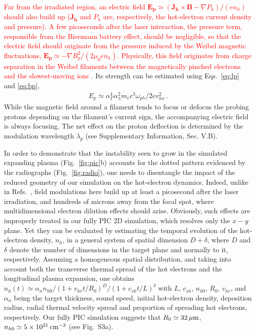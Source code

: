 \documentclass[aps,twocolumn,showpacs,superscriptaddress]{revtex4}
\begin{document}
\textcolor{red}{Far from the irradiated region, an electric field \mbox{$\mathbf{E_p} \simeq (\mathbf{J_h} \times \mathbf{B}-\nabla P_h)/(e n_h)$} should also build up ($\mathbf{J_h}$ and $P_h$ are, respectively, the hot-electron current density and pressure). A few picoseconds after the laser interaction, the pressure term, responsible from the Biermann battery effect, should be negligible, so that the electric field should originate from the pressure induced by the Weibel magnetic fluctuations, $\mathbf{E_p} \simeq - \nabla B_p^2/(2 \mu_0 e n_h)$. Physically, this field originates from charge separation in the Weibel filaments between the magnetically pinched electrons and the slowest-moving ions} \cite{POP_Dieckmann_2009, POP_Bret_Gremillet_2010}.
Its strength can be estimated using Eqs.~\eqref{eq:lp} and \eqref{eq:bp},
\begin{align} 
  E_p \simeq \alpha_\Gamma^4  \alpha_\lambda^2 m_ec^3\omega_{ph}/2ev_{hx}^2 \label{eq:ep} \, .
\end{align}
While the magnetic field around a filament tends to focus or defocus the probing protons depending on the filament's current sign, the accompanying electric field  is always focusing. The net effect on the proton deflection is determined by the modulation wavelength $\lambda_p$ (see Supplementary Information, Sec. V.B).

In order to demonstrate that the instability seen to grow in the simulated expanding plasma (Fig.~\ref{fig:pic}b) accounts for the dotted pattern evidenced by the radiographs (Fig.~\ref{fig:radio}), one needs to disentangle the impact of the reduced geometry of our simulation on the hot-electron dynamics. Indeed, unlike in Refs.~\cite{PRL_Gode_2017, NJP_Scott_2017}, field modulations here build up at least a picosecond after the laser irradiation, and hundreds of microns away from the focal spot, where multidimensional electron dilution effects should arise. Obviously, such effects are improperly treated in our fully PIC 2D simulation, which resolves only the $x-y$ plane. Yet they can be evaluated by estimating the temporal evolution of the hot-electron density, $n_h$, in a general system of spatial dimension $D+\delta$, where $D$ and $\delta$ denote the number of dimensions in the target plane and normally to it, respectively. Assuming a homogeneous spatial distribution, and taking into account both the transverse thermal spread of the hot electrons and the longitudinal plasma expansion, one obtains $n_h(t) \simeq \alpha_n n_{h0}/(1+ v_{hr} t /R_0)^D/(1+c_{sh} t/L)^\delta$ with $L$, $c_{sh}$, $n_{h0}$, $R_0$, $v_{hr}$, and $\alpha_n$ being the target thickness, sound speed, initial hot-electron density,  deposition radius, radial thermal velocity spread and proportion of spreading hot electrons, respectively. Our fully PIC simulation suggests that $R_0 \simeq 32\,\rm \mu m$, $n_{h0} \simeq 5\times 10^{21}\,\rm cm^{-3}$ (see Fig.~S3a).
\end{document}
